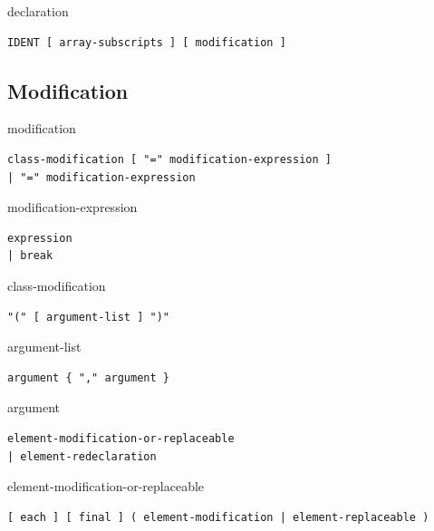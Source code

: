 \begin{production}{declaration}
\begin{lstlisting}
IDENT [ array-subscripts ] [ modification ]
\end{lstlisting}
\end{production}


\subsection{Modification}\label{modification}

\begin{production}{modification}
\begin{lstlisting}
class-modification [ "=" modification-expression ]
| "=" modification-expression
\end{lstlisting}
\end{production}

\begin{production}{modification-expression}
\begin{lstlisting}
expression
| break
\end{lstlisting}
\end{production}

\begin{production}{class-modification}
\begin{lstlisting}
"(" [ argument-list ] ")"
\end{lstlisting}
\end{production}

\begin{production}{argument-list}
\begin{lstlisting}
argument { "," argument }
\end{lstlisting}
\end{production}

\begin{production}{argument}
\begin{lstlisting}
element-modification-or-replaceable
| element-redeclaration
\end{lstlisting}
\end{production}

\begin{production}{element-modification-or-replaceable}
\begin{lstlisting}
[ each ] [ final ] ( element-modification | element-replaceable )
\end{lstlisting}
\end{production}

